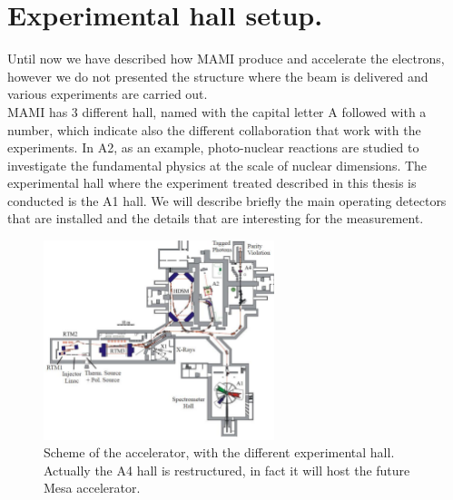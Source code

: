 \section{Experimental hall setup.}


Until now we have described how MAMI produce and accelerate the electrons, however we do not presented the structure where the beam is delivered and various experiments are carried out. \\
MAMI has 3 different hall, named with the capital letter A followed with a number, which indicate also the different collaboration that work with the experiments. In A2, as an example, photo-nuclear reactions are studied to investigate the fundamental physics at the scale of nuclear dimensions. The experimental hall where the experiment treated described in this thesis is conducted is the A1 hall. We will describe briefly the main operating detectors that are installed and the details that are interesting for the \transv measurement. \bigskip

\begin{figure}[hbtp]
\centering
\includegraphics[width = 0.6\textwidth]{ExperimentalSetup/Accelerator.pdf}
\caption{Scheme of the accelerator, with the different experimental hall. Actually the A4 hall is restructured, in fact it will host the future Mesa accelerator.}
\end{figure}

